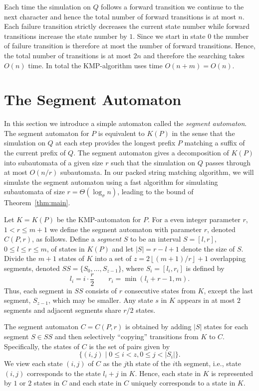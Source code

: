 \documentclass{article}
\newcommand{\floor}[1]{\left\lfloor{#1}\right\rfloor}
\begin{document}
Each time the simulation on $Q$ follows a forward transition we
continue to the next character and hence the total number of forward
transitions is at most $n$. Each failure transition strictly decreases
the current state number while forward transitions increase the state
number by $1$. Since we start in state $0$ the number of failure
transition is therefore at most the number of forward
transitions. Hence, the total number of transitions is at most $2n$
and therefore the searching takes $O(n)$ time. In total the
KMP-algorithm uses time $O(n+m) = O(n)$.

\section{The Segment Automaton}\label{sec:segment}
In this section we introduce a simple automaton called the
\emph{segment automaton}. The segment automaton for $P$ is equivalent
to $K(P)$ in the sense that the simulation on $Q$ at each step
provides the longest prefix $P$ matching a suffix of the current
prefix of $Q$. The segment automaton gives a decomposition of $K(P)$
into subautomata of a given size $r$ such that the simulation on $Q$
passes through at most $O(n/r)$ subautomata. In our packed string
matching algorithm, we will simulate the segment automaton using a fast
algorithm for simulating subautomata of size $r = \Theta(\log_\sigma
n)$, leading to the bound of Theorem~\ref{thm:main}. 



Let $K = K(P)$ be the KMP-automaton for $P$. For a even integer
parameter $r$, $1 < r \leq m+1$ we define the segment automaton with
parameter $r$, denoted $C(P, r)$, as follows. Define a \emph{segment}
$S$ to be an interval $S = [l, r]$, $0 \leq l \leq r \leq m$, of
states in $K(P)$ and let $|S| = r - l + 1$ denote the size of
$S$. Divide the $m+1$ states of $K$ into a set of $z =
2\floor{(m+1)/r} + 1$ overlapping segments, denoted $SS = \{S_0,
\ldots, S_{z-1}\}$, where $S_i = [l_i, r_i]$ is defined by
\begin{equation*}
l_i = i \cdot \frac{r}{2} \qquad r_i = \min(l_i + r - 1, m) .
\end{equation*}
Thus, each segment in $SS$ consists of $r$ consecutive states from
$K$, except the last segment, $S_{z-1}$, which may be smaller. Any
state $s$ in $K$ appears in at most $2$ segments and adjacent segments
share $r/2$ states.


The segment automaton $C = C(P,r)$ is obtained by adding $|S|$ states
for each segment $S \in SS$ and then selectively ``copying''
transitions from $K$ to $C$. Specifically, the states of $C$ is the
set of pairs given by
$$
\{(i,j) \mid 0 \leq i < z, 0 \leq j < |S_i|\} .
$$ 
We view each state $(i,j)$ of $C$ as the $j$th state of the $i$th
segment, i.e., state $(i,j)$ corresponds to the state $l_i + j$ in
$K$. Hence, each state in $K$ is represented by $1$ or $2$ states in
$C$ and each state in $C$ uniquely corresponds to a state in $K$.
\end{document}
